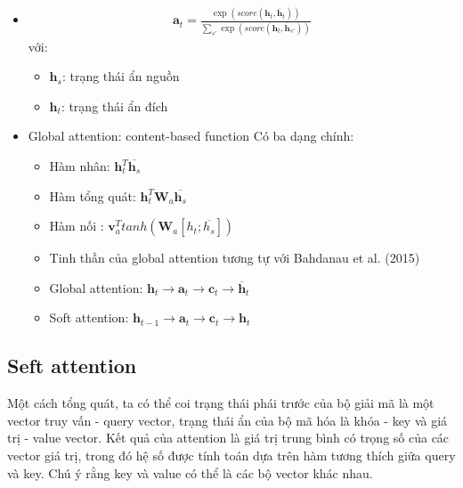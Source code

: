 \documentclass[14pt]{extreport}
\begin{document}
\begin{itemize}
\begin{itemize}
    \item \begin{align}
    \textbf{a}_{t}= \frac{\exp (score(\textbf{h}_{t},\overline{\textbf{h}}_{t} ))}{\sum_{s'}\exp (score(\textbf{h}_{t},\overline{\textbf{h}}_{s'} ))}
\end{align}
với:
\begin{itemize}
    \item $\textbf{h}_{s}$: trạng thái ẩn nguồn
    \item $\textbf{h}_{t}$: trạng thái ẩn đích
\end{itemize}
\item Global attention: content-based function
Có ba dạng chính:
\begin{itemize}
    \item Hàm nhân: $\textbf{h}_{t}^{T}\overline{\textbf{h}_{s}}$
    \item Hàm tổng quát: $\textbf{h}_{t}^{T}\textbf{W}_{a}\overline{\textbf{h}_{s}}$
    \item Hàm nối : $\textbf{v}_{a}^{T}tanh(\textbf{W}_{a}[h_{t}; \overline{h_{s}}])$
\end{itemize}
\begin{itemize}
    \item Tinh thần của global attention tương tự với Bahdanau et al. (2015)
    \item Global attention: $\textbf{h}_{t}\rightarrow \textbf{a}_{t} \rightarrow \textbf{c}_{t} \rightarrow \overline{\textbf{h}}_{t}$
    \item Soft attention: $\textbf{h}_{t-1}\rightarrow \textbf{a}_{t} \rightarrow \textbf{c}_{t} \rightarrow \textbf{h}_{t}$
\end{itemize}
\end{itemize}
\end{itemize}




\subsection{Seft attention}

Một cách tổng quát, ta có thể coi trạng thái phái trước của bộ giải mã là một vector truy vấn - query vector, trạng thái ẩn của bộ mã hóa là khóa - key và giá trị - value vector. Kết quả của attention là giá trị trung bình có trọng số của các vector giá trị, trong đó hệ số được tính toán dựa trên hàm tương thích giữa query và key. Chú ý rằng key và value  có thể là các bộ vector khác nhau.
\end{document}
